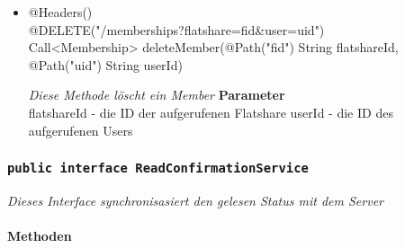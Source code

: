 \begin{itemize}
             	      \item{@Headers()\\ @DELETE("/memberships?flatshare={fid}\&user={uid}")\\Call<Membership> deleteMember(@Path("fid") String flatshareId, @Path("uid") String userId)}
        	
      	 	 	\textit{Diese Methode löscht ein Member}        	
        		\textbf{Parameter} \\
        		flatshareId - die ID der aufgerufenen Flatshare 
                userId - die ID des aufgerufenen Users
        	       		             
        	             
       		 \end{itemize}
             
             	\subsubsection{\texttt{public interface  ReadConfirmationService }}
        \textit{ Dieses Interface synchronisasiert den gelesen Status mit dem Server}\\
        \\
		\textbf{Methoden} \\
 			
